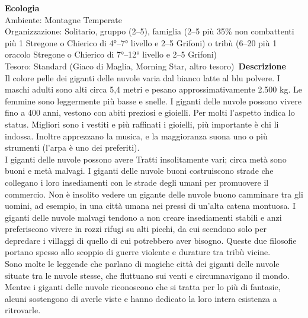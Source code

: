 \begin{multicols}{2}
\textbf{Ecologia}\\
Ambiente: Montagne Temperate\\
Organizzazione: Solitario, gruppo (2–5), famiglia (2–5 più 35\% non combattenti più 1 Stregone o Chierico di 4°–7° livello e 2–5 Grifoni) o tribù (6–20 più 1 oracolo Stregone o Chierico di 7°–12° livello e 2–5 Grifoni)\\
Tesoro: Standard (Giaco di Maglia, Morning Star, altro tesoro)\
\textbf{Descrizione}\\
Il colore pelle dei giganti delle nuvole varia dal bianco latte al blu polvere. I maschi adulti sono alti circa 5,4 metri e pesano approssimativamente 2.500 kg. Le femmine sono leggermente più basse e snelle. I giganti delle nuvole possono vivere fino a 400 anni, vestono con abiti preziosi e gioielli. Per molti l'aspetto indica lo status. Migliori sono i vestiti e più raffinati i gioielli, più importante è chi li indossa. Inoltre apprezzano la musica, e la maggioranza suona uno o più strumenti (l'arpa è uno dei preferiti).\\

I giganti delle nuvole possono avere Tratti insolitamente vari; circa metà sono buoni e metà malvagi. I giganti delle nuvole buoni costruiscono strade che collegano i loro insediamenti con le strade degli umani per promuovere il commercio. Non è insolito vedere un gigante delle nuvole buono camminare tra gli uomini, ad esempio, in una città umana nei pressi di un'alta catena montuosa. I giganti delle nuvole malvagi tendono a non creare insediamenti stabili e anzi preferiscono vivere in rozzi rifugi su alti picchi, da cui scendono solo per depredare i villaggi di quello di cui potrebbero aver bisogno. Queste due filosofie portano spesso allo scoppio di guerre violente e durature tra tribù vicine.\\

Sono molte le leggende che parlano di magiche città dei giganti delle nuvole situate tra le nuvole stesse, che fluttuano sui venti e circumnavigano il mondo. Mentre i giganti delle nuvole riconoscono che si tratta per lo più di fantasie, alcuni sostengono di averle viste e hanno dedicato la loro intera esistenza a ritrovarle.\\


\end{multicols}
